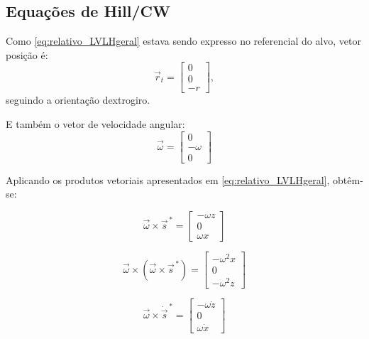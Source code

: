 \subsection{Equações de Hill/CW}

Como \eqref{eq:relativo_LVLHgeral} estava sendo expresso no referencial do alvo, vetor posição é:
\begin{equation}
\label{eq:posicao_LVLH_target}
\vec r_t
=
\begin{bmatrix}
0 \\
0 \\
-r
\end{bmatrix},
\end{equation}
seguindo a orientação dextrogiro.

E também o vetor de velocidade angular:
\begin{equation}
\label{eq:velocidadeAngular_LVLH_target}
\vec\omega=
\begin{bmatrix}
0 \\
-\omega \\
0
\end{bmatrix}
\end{equation}

Aplicando os produtos vetoriais apresentados em \eqref{eq:relativo_LVLHgeral}, obtêm-se:

\begin{equation}
\label{eq:velAngular_cross_s}
\vec\omega \times \vec s^{\,*} =
\begin{bmatrix}
-\omega z \\
0         \\
\omega x
\end{bmatrix} 
\end{equation}

\begin{equation}
\label{eq:velAngular_cross_cross_s}
\vec\omega \times (\vec\omega \times \vec s^{\,*} )
=
\begin{bmatrix}
-\omega^2 x \\
0           \\
-\omega^2 z 
\end{bmatrix}
\end{equation}

\begin{equation}
\label{eq:omega_cross_dsdt}
\vec\omega \times \dot{\vec s}^{\,*} 
=
\begin{bmatrix}
-\omega \dot z \\
0 \\
\omega \dot x
\end{bmatrix}
\end{equation}

